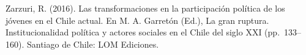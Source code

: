 \documentclass[12pt,twoside]{templates/facsothesis}
\begin{document}
Zarzuri, R. (2016). Las transformaciones en la participación política de los jóvenes en el Chile actual. En M. A. Garretón (Ed.), La gran ruptura. Institucionalidad política y actores sociales en el Chile del siglo XXI (pp.~133--160). Santiago de Chile: LOM Ediciones.



\end{document}
